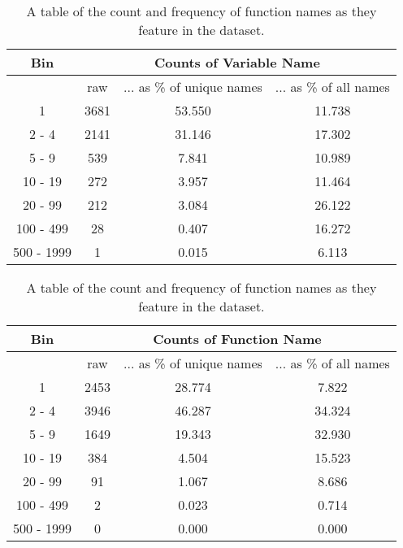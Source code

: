 \begin{table}[h!]
    \begin{center}
    \begin{tabular}{c | c | c | c  }       
     Bin   & \multicolumn{3}{c}{Counts of Variable Name}   \\
    \hline
     &     raw &... as \% of unique names & ... as \% of all names   \\  
    \hline     
     1     &      3681 &   53.550 &   11.738  \\          
     2 - 4 &      2141 &   31.146 &   17.302  \\          
     5 - 9 &       539 &    7.841 &   10.989  \\          
     10 - 19 &     272 &    3.957 &   11.464  \\          
     20 - 99 &     212 &    3.084 &   26.122  \\          
     100 - 499 &    28 &    0.407 &   16.272  \\          
     500 - 1999 &    1 &    0.015 &    6.113  \\                

    \end{tabular}
        \caption { A table of the count and frequency of variable names as they feature in the dataset.}
    \label{table:popular_variable_names}

    \begin{tabular}{c | c | c | c  }       

     Bin   & \multicolumn{3}{c}{Counts of Function Name}   \\
    \hline
     &     raw &... as \% of unique names & ... as \% of all names   \\  
    \hline     
    1   &      2453 &   28.774 &    7.822  \\          
    2 - 4 &      3946 &   46.287 &   34.324  \\          
    5 - 9 &      1649 &   19.343 &   32.930  \\          
    10 - 19 &     384 &    4.504 &   15.523  \\          
    20 - 99 &      91 &    1.067 &    8.686  \\          
    100 - 499 &     2 &    0.023 &    0.714  \\          
    500 - 1999 &    0 &    0.000 &    0.000  \\             

    \end{tabular}
        \caption { A table of the count and frequency of function names as they feature in the dataset.}
    \label{table:popular_variable_names}

    \end{center}
\end{table}



